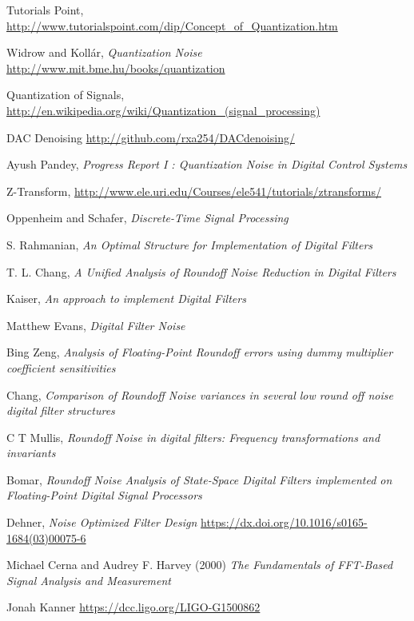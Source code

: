 \begin{thebibliography}{100}

 Tutorials Point, \url{http://www.tutorialspoint.com/dip/Concept_of_Quantization.htm}

 Widrow and Koll\'ar, \emph{Quantization Noise} 				\url{http://www.mit.bme.hu/books/quantization}

 Quantization of Signals, \url{http://en.wikipedia.org/wiki/Quantization_(signal_processing)}

 DAC Denoising \url{http://github.com/rxa254/DACdenoising/}

 Ayush Pandey, \emph{Progress Report I : Quantization Noise in Digital Control Systems}

 Z-Transform, \url{http://www.ele.uri.edu/Courses/ele541/tutorials/ztransforms/}

 Oppenheim and Schafer, \emph{Discrete-Time Signal Processing}

 S. Rahmanian, \emph{An Optimal Structure for Implementation of Digital Filters}

 T. L. Chang, \emph{A Unified Analysis of Roundoff Noise Reduction in Digital Filters}

 Kaiser, \emph{An approach to implement Digital Filters}

 Matthew Evans, \emph{Digital Filter Noise}

 Bing Zeng, \emph{Analysis of Floating-Point Roundoff errors using dummy multiplier coefficient sensitivities}

 Chang, \emph{Comparison of Roundoff Noise variances in several low round off noise digital filter structures}

 C T Mullis, \emph{Roundoff Noise in digital filters: Frequency transformations and invariants}
%

 Bomar, \emph{Roundoff Noise Analysis of State-Space Digital Filters implemented on Floating-Point Digital Signal Processors}

 Dehner, \emph{Noise Optimized Filter Design} 		\url{https://dx.doi.org/10.1016/s0165-1684(03)00075-6}

 Michael Cerna and Audrey F. Harvey (2000) \emph{The Fundamentals of FFT-Based Signal Analysis and Measurement}

 Jonah Kanner \url{https://dcc.ligo.org/LIGO-G1500862}


\end{thebibliography}
